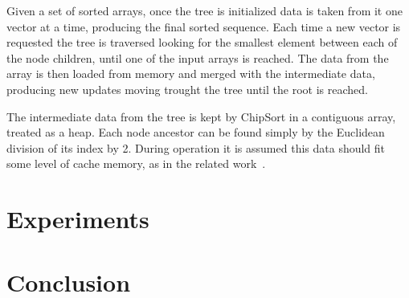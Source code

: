 \documentclass{juliacon}
\begin{document}
Given a set of sorted arrays, once the tree is initialized data is taken from it one vector at a time, producing the final sorted sequence. Each time a new vector is requested the tree is traversed looking for the smallest element between each of the node children, until one of the input arrays is reached. The data from the array is then loaded from memory and merged with the intermediate data, producing new updates moving trought the tree until the root is reached.

The intermediate data from the tree is kept by ChipSort in a contiguous array, treated as a heap. Each node ancestor can be found simply by the Euclidean division of its index by 2. During operation it is assumed this data should fit some level of cache memory, as in the related work~\cite{DBLP:conf/IEEEpact/InoueMKN07,DBLP:journals/pvldb/ChhuganiNLMHCBKD08,DBLP:journals/pvldb/InoueT15}.


\section{Experiments}
\label{sec:experiments}
%
\section{Conclusion}
\label{sec:conclusion}
%



\end{document}
